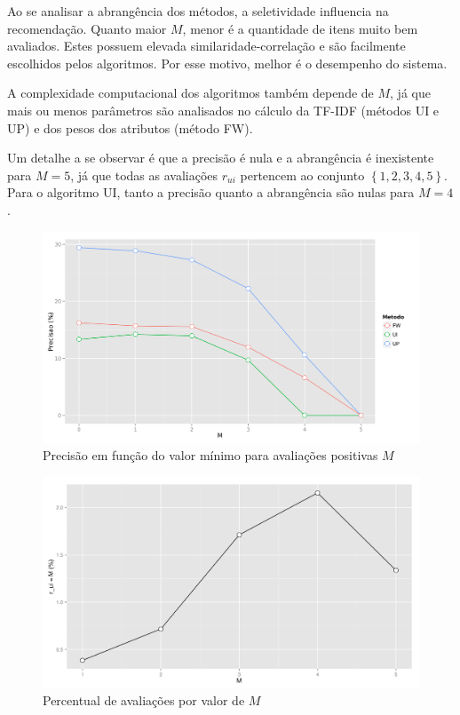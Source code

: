 Ao se analisar a abrangência dos métodos, a seletividade influencia na recomendação. Quanto maior $M$, menor é a quantidade de itens muito bem avaliados. Estes possuem elevada similaridade-correlação e são facilmente escolhidos pelos algoritmos. Por esse motivo, melhor é o desempenho do sistema.

A complexidade computacional dos algoritmos também depende de $M$, já que mais ou menos parâmetros são analisados no cálculo da TF-IDF (métodos UI e UP) e dos pesos dos atributos (método FW).

Um detalhe a se observar é que a precisão é nula e a abrangência é inexistente para $M=5$, já que todas as avaliações $r_{ui}$ pertencem ao conjunto $\left\{1,2,3,4,5\right\}$. 
Para o algoritmo UI, tanto a precisão quanto a abrangência são nulas para $M=4$.

\begin{figure}[htp]
    \begin{center}
    \includegraphics[width=1\textwidth]{img/precision_M}
    \end{center}
    \caption{Precisão em função do valor mínimo para avaliações positivas $M$}
    \label{fig:precision_M}
\end{figure}

\begin{figure}[htp]
    \begin{center}
    \includegraphics[width=1\textwidth]{img/percentual_M}
    \end{center}
    \caption{Percentual de avaliações por valor de $M$}
    \label{fig:percentual_M}
\end{figure}

